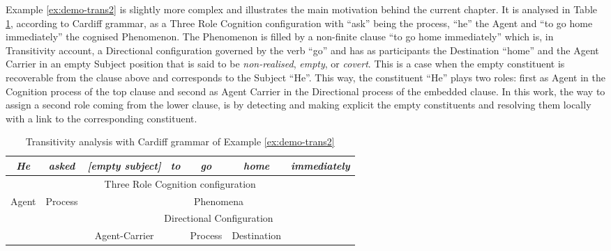Example \ref{ex:demo-trans2} is slightly more complex and illustrates the main motivation behind the current chapter. It is analysed in Table \ref{tab:demo-trans2}, according to Cardiff grammar, as a Three Role Cognition configuration with ``ask'' being the process, ``he'' the Agent and ``to go home immediately'' the cognised Phenomenon. The Phenomenon is filled by a non-finite clause ``to go home immediately'' which is, in Transitivity account, a Directional configuration governed by the verb ``go'' and has as participants the Destination ``home'' and the Agent Carrier in an empty Subject position that is said to be \textit{non-realised}, \textit{empty}, or \textit{covert}. This is a case when the empty constituent is recoverable from the clause above and corresponds to the Subject ``He''. This way, the constituent ``He'' plays two roles: first as Agent in the Cognition process of the top clause and second as Agent Carrier in the Directional process of the embedded clause. In this work, the way to assign a second role coming from the lower clause, is by detecting and making explicit the empty constituents and resolving them locally with a link to the corresponding constituent.


\begin{table}[!ht]
    \centering
    \begin{tabular}{cc|c|c|c|c|c}
        \hline
        \multicolumn{1}{|c|}{\textit{He}} & \textit{asked} & \textit{{[}empty subject{]}} & \textit{to} & \textit{go} & \textit{home} & \multicolumn{1}{c|}{\textit{immediately}} \\ \hline
        \multicolumn{7}{|c|}{Three Role Cognition configuration}                                                                                                                      \\ \hline
        \multicolumn{1}{|c|}{Agent}           & Process        & \multicolumn{5}{c|}{Phenomena}                                                                                       \\ \hline
        &                & \multicolumn{5}{c|}{Directional Configuration}                                                                       \\ \cline{3-7} 
        &                & Agent-Carrier                &             & Process     & Destination   &                                           \\ \cline{3-3} \cline{5-6}
    \end{tabular}
    \caption{Transitivity analysis with Cardiff grammar of Example \ref{ex:demo-trans2}}
    \label{tab:demo-trans2}
\end{table}

